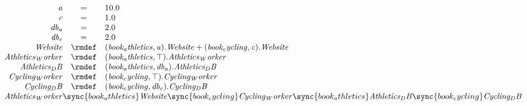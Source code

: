 \begin{displaymath}
	\begin{array}{rcl}
		\mathit{a} & = & 10.0\\
		\mathit{c} & = & 1.0\\
		\mathit{db_a} & = & 2.0\\
		\mathit{db_c} & = & 2.0\\
[0.0ex]		\mathit{Website} & \rmdef & (\mathit{book_athletics},\mathit{a}).\mathit{Website}+(\mathit{book_cycling},\mathit{c}).\mathit{Website}\\
		\mathit{Athletics_Worker} & \rmdef & (\mathit{book_athletics},\top).\mathit{Athletics_Worker}\\
		\mathit{Athletics_DB} & \rmdef & (\mathit{book_athletics},\mathit{db_a}).\mathit{Athletics_DB}\\
		\mathit{Cycling_Worker} & \rmdef & (\mathit{book_cycling},\top).\mathit{Cycling_Worker}\\
		\mathit{Cycling_DB} & \rmdef & (\mathit{book_cycling},\mathit{db_c}).\mathit{Cycling_DB}\\
[0.0ex]		\multicolumn{3}{l}{\mathit{Athletics_Worker}\sync{book_athletics}\mathit{Website}\sync{book_cycling}\mathit{Cycling_Worker}\sync{book_athletics}\mathit{Athletics_DB}\sync{book_cycling}\mathit{Cycling_DB}}\\
[0.0ex]	\end{array}
\end{displaymath}
